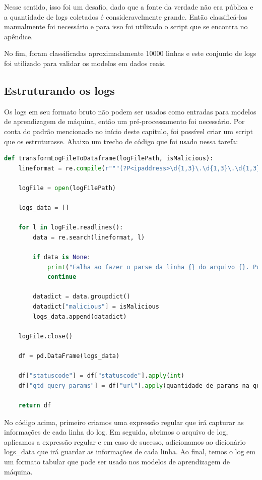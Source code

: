 Nesse sentido, isso foi um desafio, dado que a fonte da verdade não era pública e a quantidade de logs 
coletados é consideravelmente grande. Então classificá-los manualmente foi necessário e para 
isso foi utilizado o script que se encontra no apêndice.

No fim, foram classificadas aproximadamente 10000 linhas e este conjunto de logs foi utilizado para validar os modelos em dados
reais.

\subsection{Estruturando os logs}

Os logs em seu formato bruto não podem ser usados como entradas para modelos de aprendizagem
de máquina, então um pré-processamento foi necessário. Por conta do padrão mencionado no  início deste capítulo, 
foi possível criar um script que os estruturasse. Abaixo um trecho de código
que foi usado nessa tarefa:

\begin{lstlisting}[language=Python]
def transformLogFileToDataframe(logFilePath, isMalicious):
    lineformat = re.compile(r"""(?P<ipaddress>\d{1,3}\.\d{1,3}\.\d{1,3}\.\d{1,3}) - - \[(?P<dateandtime>\d{2}\/[a-z]{3}\/\d{4}:\d{2}:\d{2}:\d{2} (\+|\-)\d{4})\] ((\"(GET|POST) )(?P<url>.+)(http\/[1-2]\.[0-9]")) (?P<statuscode>\d{3}) (?P<bytessent>\d+) (?P<refferer>-|"([^"]+)") (["](?P<useragent>[^"]+)["])""", re.IGNORECASE)

    logFile = open(logFilePath)

    logs_data = []

    for l in logFile.readlines():
        data = re.search(lineformat, l)

        if data is None:
            print("Falha ao fazer o parse da linha {} do arquivo {}. Pulando..".format(l, logFile))
            continue

        datadict = data.groupdict()
        datadict["malicious"] = isMalicious
        logs_data.append(datadict)

    logFile.close()

    df = pd.DataFrame(logs_data)

    df["statuscode"] = df["statuscode"].apply(int)
    df["qtd_query_params"] = df["url"].apply(quantidade_de_params_na_query)

    return df
\end{lstlisting}

No código acima, primeiro criamos uma expressão regular que irá capturar as informações de cada linha do log. 
Em seguida, abrimos o arquivo de log, aplicamos a expressão regular e em caso de sucesso, adicionamos ao 
dicionário logs\_data que irá guardar as informações de cada linha. Ao final, temos o log em um formato tabular
que pode ser usado nos modelos de aprendizagem de máquina.